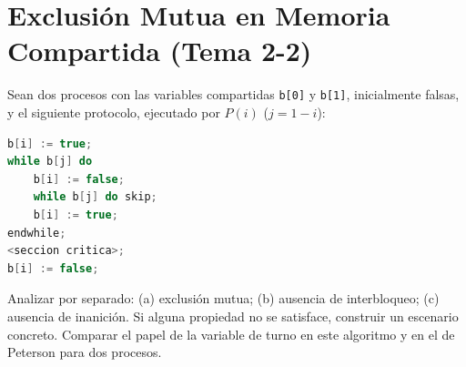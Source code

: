 \documentclass[11pt,a4paper,twoside,openright]{report}
\begin{document}
\chapter{Exclusión Mutua en Memoria Compartida (Tema 2-2)}
\label{bloque:exclusion}


\begin{ejercicio}
Sean dos procesos con las variables compartidas \texttt{b[0]} y \texttt{b[1]}, inicialmente falsas, y el siguiente protocolo, ejecutado por $P(i)$ ($j=1-i$):
\begin{lstlisting}[language=C++]
b[i] := true;
while b[j] do
    b[i] := false;
    while b[j] do skip;
    b[i] := true;
endwhile;
<seccion critica>;
b[i] := false;
\end{lstlisting}
Analizar por separado: (a) exclusión mutua; (b) ausencia de interbloqueo; (c) ausencia de inanición. Si alguna propiedad no se satisface, construir un escenario concreto. Comparar el papel de la variable de turno en este algoritmo y en el de Peterson para dos procesos.
\end{ejercicio}
\end{document}
